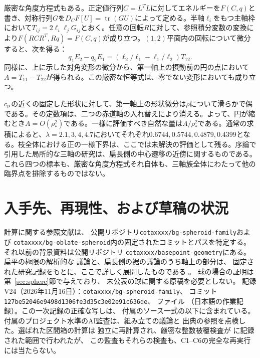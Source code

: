 厳密な角度方程式もある。正定値行列$C=L^TL$に対してエネルギーを$F(C,q)$と書き、対称行列$G$を$D_CF[U]=\operatorname{tr}(GU)$によって定める。半軸$\ell_i$をもつ主軸枠において$T_{ij}=2\ell_i\ell_jG_{ij}$とおく。任意の回転$R$に対して、参照積分変数の変換により$F(RCR^T,Rq)=F(C,q)$が成り立つ。$(1,2)$平面内の回転について微分すると、次を得る：
\[
 q_1E_2-q_2E_1=(\ell_2/\ell_1-\ell_1/\ell_2)T_{12}.
\]
同様に、上に示した対角変形の微分から、第一軸上の摂動前の円の点において$A=T_{11}-T_{22}$が得られる。この厳密な恒等式は、零でない変形においても成り立つ。

$c_{\mathrm p}$の近くの固定した形状に対して、第一軸上の形状微分は$\rho$について滑らかで偶である。その定数項は、二つの赤道軸の入れ替えにより消える。よって、円が縮むとき$A=O(\rho_*^2)$である。一様に評価すべき自然な量は$A/\rho_*^2$である。通常の求積によると、$\lambda=2.1,3,4,4.7$においてそれぞれ$0.6744,0.5744,0.4879,0.4399$となる。枝全体における正の一様下界は、ここでは未解決の評価として残る。序論で引用した局所的な三軸の研究は、扁長側の中心遷移の近傍に関するものである。これら四つの標本も、厳密な角度方程式それ自体も、三軸族全体にわたって他の臨界点を排除するものではない。

\section{入手先、再現性、および草稿の状況}
\label{sec:availability}

計算に関する参照文献は、
公開リポジトリ\texttt{cotaxxxx/bg-spheroid-family}および
\texttt{cotaxxxx/bg-oblate-spheroid}内の固定されたコミットとパスを特定する。
それ以前の背景資料は公開リポジトリ
\texttt{cotaxxxx/basepoint-geometry}にある。扁平の極限の解析的な
議論と、扁長側の裾の議論のうち軸上の部分は、
固定された研究記録をもとに、ここで詳しく展開したものである
\citep{data-oblate-analytic,data-prolate-axis}。
球の場合の証明は第~\ref{sec:sphere}節で与えており、
未公表の球に関する原稿を必要としない。
記録V24（2026年11月16日）：\texttt{cotaxxxx/bg-spheroid-family}、
コミット\texttt{127be52046e9498d1306fe3d35c3e02e91c636de}、
ファイル\href{https://github.com/cotaxxxx/bg-spheroid-family/blob/127be52046e9498d1306fe3d35c3e02e91c636de/runs/2026-11-16/D_OB_GLOBAL_CLOSED_V24/JUDGE_RULING_D_OB_GLOBAL_CLOSED_20261116.md}{}%
（日本語の作業記録）。この一次記録の正確な写しは、
付属のソース一式の以下に含まれている。
付属のプロジェクト水準のAI監査は、組み立ての議論と
出典の参照を点検した。選ばれた区間箱の計算は
独立に再計算され、厳密な整数被覆検査が
に記録された範囲で行われたが、
この監査もそれらの検査も、C1--C6の完全な再実行には当たらない。

